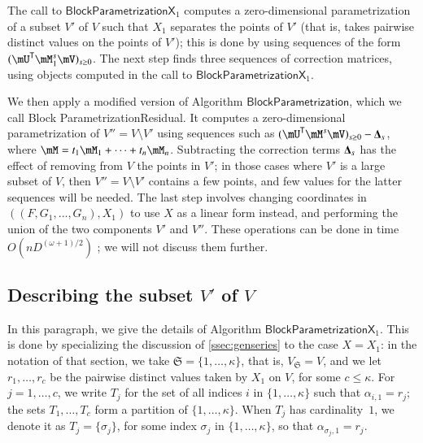 \documentclass[final,1p,times,authoryear]{elsarticle}
\newcommand{\mat}[1]{\bm{\MakeUppercase{#1}}} %
\newcommand{\mainalgoname}{\mathsf{ BlockParametrization}}
\newcommand{\lf}{X}
\newcommand{\trsp}[1]{#1^{\mathsf{T}}} %
\def\dg{\kappa}
\newcommand{\mUt}{\trsp{\mU}}
\begin{document}
The call to $\mathsf{BlockParametrizationX}_1$ computes a zero-dimensional
parametrization of a subset $V'$ of $V$ such that $X_1$ separates the
points of $V'$ (that is, takes pairwise distinct values on the points
of $V'$); this is done by using sequences of the form $(\mUt
\mM_1^s \mV)_{s \ge 0}$. The next step finds three 
sequences of correction matrices, using objects computed 
in the call to  $\mathsf{BlockParametrizationX}_1$.

We then apply a modified version of Algorithm $\mainalgoname$, which we call
{\sf Block} {\sf ParametrizationResidual}. It computes a zero-dimensional
parametrization of $V''=V\setminus V'$ using sequences such as $(\mUt
\mM^s \mV)_{s \ge 0} - \mat{\Delta}_s$, where $\mM= t_1 \mM_1 + \cdots
+ t_n \mM_n$. Subtracting the correction terms $\mat{\Delta}_s$ has
the effect of removing from $V$ the points in $V'$; in those
cases where $V'$ is a large subset of $V$, then $V''=V\setminus V'$ contains
a few points, and few values for the latter sequences will be needed.
The last step involves changing coordinates in $((F,G_1,\dots,G_n),X_1)$ to use
$\lf$ as a linear form instead, and performing the union of the two components
$V'$ and $V''$. These operations can be done in time $O(n D^{(\omega+1)/2})$
\citep[Lemmas~2 \&~3]{PoSc13b}; we will not discuss them further.



\subsection{Describing the subset \texorpdfstring{$V'$}{V'} of \texorpdfstring{$V$}{V}}

In this paragraph, we give the details of Algorithm
$\mathsf{BlockParametrizationX}_1$. This is done by specializing the
discussion of \cref{ssec:genseries} to the case $\lf=X_1$:
in the notation of that section, we take
$\mathfrak{S}=\{1,\dots,\dg\}$, that is, $V_{\mathfrak{S}}=V$, and we
let $r_1,\dots,r_c$ be the pairwise distinct values taken by $X_1$ on
$V$, for some $c \le \dg$.  For $j=1,\dots,c$, we write $T_j$ for the
set of all indices $i$ in $\{1,\dots,\dg\}$ such that
$\alpha_{i,1}=r_j$; the sets $T_1,\dots,T_c$ form a partition of
$\{1,\dots,\dg\}$. When $T_j$ has cardinality~$1$, we denote it as
$T_j=\{\sigma_j\}$, for some index $\sigma_j$ in $\{1,\dots,\dg\}$, so
that $\alpha_{\sigma_j,1}=r_j$.
\end{document}
